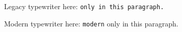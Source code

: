 Legacy typewriter here: \tt only in this paragraph.

Modern typewriter here: \texttt{modern} only in this paragraph.

